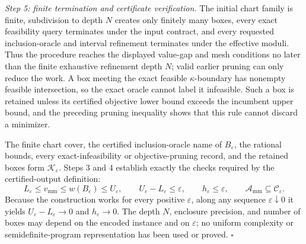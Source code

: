 \emph{Step 5: finite termination and certificate verification.}
The initial chart family is finite, subdivision to depth \(N\) creates only finitely many boxes, every exact feasibility query terminates under the input contract, and every requested inclusion-oracle and interval refinement terminates under the effective moduli.  Thus the procedure reaches the displayed value-gap and mesh conditions no later than the finite exhaustive refinement depth \(N\); valid earlier pruning can only reduce the work.  A box meeting the exact feasible \(\kappa\)-boundary has nonempty feasible intersection, so the exact oracle cannot label it infeasible.  Such a box is retained unless its certified objective lower bound exceeds the incumbent upper bound, and the preceding pruning inequality shows that this rule cannot discard a minimizer.

The finite chart cover, the certified inclusion-oracle name of \(B_\varepsilon\), the rational bounds, every exact-infeasibility or objective-pruning record, and the retained boxes form \(\mathscr K_\varepsilon\).  Steps 3 and 4 establish exactly the checks required by the certified-output definition:
\[
L_\varepsilon\le v_{\mathrm{mm}}\le w(B_\varepsilon)\le U_\varepsilon,
\qquad
U_\varepsilon-L_\varepsilon\le\varepsilon,
\qquad
h_\varepsilon\le\varepsilon,
\qquad
\mathcal A_{\mathrm{mm}}\subseteq\mathcal C_\varepsilon.
\]
Because the construction works for every positive \(\varepsilon\), along any sequence \(\varepsilon\downarrow0\) it yields \(U_\varepsilon-L_\varepsilon\to0\) and \(h_\varepsilon\to0\).  The depth \(N\), enclosure precision, and number of boxes may depend on the encoded instance and on \(\varepsilon\); no uniform complexity or semidefinite-program representation has been used or proved. \(\square\)